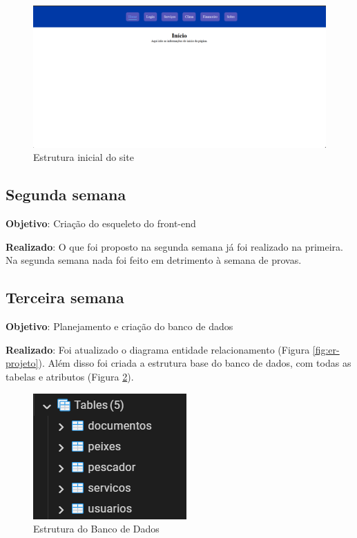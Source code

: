\documentclass[a4paper]{abntex2}
\begin{document}
\begin{figure}[H]
    \centering
    \includegraphics[width=1.0\linewidth]{imagens/estrutura-inicial-projeto.png}
    \caption{Estrutura inicial do site}
    \label{fig:estrutura-inicial-projeto}
\end{figure}

\subsection{Segunda semana}

\textbf{Objetivo}: Criação do esqueleto do front-end

\textbf{Realizado}: O que foi proposto na segunda semana já foi realizado na primeira. Na segunda semana nada foi feito em detrimento à semana de provas.

\subsection{Terceira semana}

\textbf{Objetivo}: Planejamento e criação do banco de dados

\textbf{Realizado}: Foi atualizado o diagrama entidade relacionamento (Figura \ref{fig:er-projeto}). Além disso foi criada a estrutura base do banco de dados, com todas as tabelas e atributos (Figura \ref{fig:estrutura-banco-de-dados}).

\begin{figure}[H]
    \centering
    \includegraphics[width=0.5\linewidth]{imagens/estrutura-banco-de-dados.png}
    \caption{Estrutura do Banco de Dados}
    \label{fig:estrutura-banco-de-dados}
\end{figure}
\end{document}
